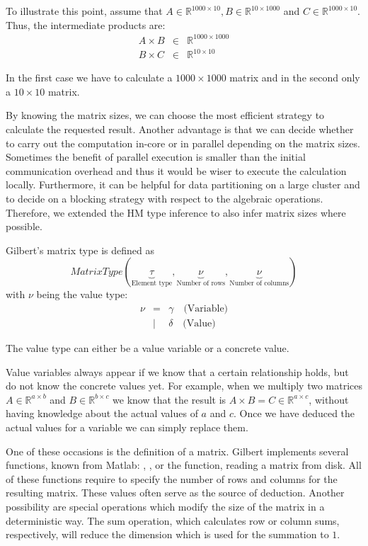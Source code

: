 To illustrate this point, assume that $A\in \mathbb{R}^{1000\times 10}, B\in \mathbb{R}^{10\times 1000}$ and $C \in \mathbb{R}^{1000\times 10}$.
Thus, the intermediate products are:
\begin{eqnarray*}
  A\times B &\in& \mathbb{R}^{1000 \times 1000}\\
  B\times C &\in& \mathbb{R}^{10 \times 10}
\end{eqnarray*}

In the first case we have to calculate a $1000 \times 1000$ matrix and in the second only a $10 \times 10$ matrix.

By knowing the matrix sizes, we can choose the most efficient strategy to calculate the requested result.
Another advantage is that we can decide whether to carry out the computation in-core or in parallel depending on the matrix sizes.
Sometimes the benefit of parallel execution is smaller than the initial communication overhead and thus it would be wiser to execute the calculation locally.
Furthermore, it can be helpful for data partitioning on a large cluster and to decide on a blocking strategy with respect to the algebraic operations.
Therefore, we extended the HM type inference to also infer matrix sizes where possible.

Gilbert's matrix type is defined as 
\begin{displaymath}
MatrixType(\underbrace{\tau}_{\text{Element type}},\underbrace{\nu}_{\text{Number of rows}},\underbrace{\nu}_{\text{Number of columns}})
\end{displaymath}
with $\nu$ being the value type:
\begin{eqnarray*}
  \nu &=& \gamma\quad\text{(Variable)} \\
  &|& \delta\quad\text{(Value)}
\end{eqnarray*}

The value type can either be a value variable or a concrete value.

Value variables always appear if we know that a certain relationship holds, but do not know the concrete values yet.
For example, when we multiply two matrices $A\in\mathbb{R}^{a\times b}$ and $B\in\mathbb{R}^{b\times c}$ we know that the result is $A\times B = C \in \mathbb{R}^{a\times c}$, without having knowledge about the actual values of $a$ and $c$.
Once we have deduced the actual values for a variable we can simply replace them.

One of these occasions is the definition of a matrix.
Gilbert implements several functions, known from Matlab: , ,  or the  function, reading a matrix from disk.
All of these functions require to specify the number of rows and columns for the resulting matrix.
These values often serve as the source of deduction.
Another possibility are special operations which modify the size of the matrix in a deterministic way.
The sum operation, which calculates row or column sums, respectively, will reduce the dimension which is used for the summation to $1$.

